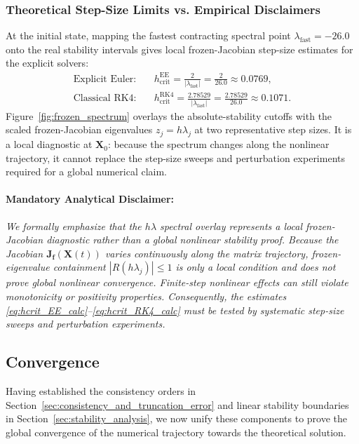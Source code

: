 \subsubsection{Theoretical Step-Size Limits vs. Empirical Disclaimers}
At the initial state, mapping the fastest contracting spectral point $\lambda_{\mathrm{fast}}=-26.0$ onto the real stability intervals gives local frozen-Jacobian step-size estimates for the explicit solvers:
\begin{align}
\text{Explicit Euler:} \quad & h_{\mathrm{crit}}^{\mathrm{EE}} = \frac{2}{|\lambda_{\mathrm{fast}}|} = \frac{2}{26.0} \approx 0.0769, \label{eq:hcrit_EE_calc} \\
\text{Classical RK4:} \quad & h_{\mathrm{crit}}^{\mathrm{RK4}} = \frac{2.78529}{|\lambda_{\mathrm{fast}}|} = \frac{2.78529}{26.0} \approx 0.1071. \label{eq:hcrit_RK4_calc}
\end{align}
Figure~\ref{fig:frozen_spectrum} overlays the absolute-stability cutoffs
with the scaled frozen-Jacobian eigenvalues $z_j=h\lambda_j$ at two
representative step sizes. It is a local diagnostic at $\mathbf{X}_0$:
because the spectrum changes along the nonlinear trajectory, it cannot
replace the step-size sweeps and perturbation experiments required for a
global numerical claim.

\paragraph{Mandatory Analytical Disclaimer:}
\emph{We formally emphasize that the $h\lambda$ spectral overlay represents a local frozen-Jacobian diagnostic rather than a global nonlinear stability proof. Because the Jacobian $\mathbf{J}_{\mathbf{f}}(\mathbf{X}(t))$ varies continuously along the matrix trajectory, frozen-eigenvalue containment $|R(h\lambda_j)| \le 1$ is only a local condition and does not prove global nonlinear convergence. Finite-step nonlinear effects can still violate monotonicity or positivity properties. Consequently, the estimates \eqref{eq:hcrit_EE_calc}--\eqref{eq:hcrit_RK4_calc} must be tested by systematic step-size sweeps and perturbation experiments.}

\subsection{Convergence}

\label{sec:convergence}

Having established the consistency orders in Section~\ref{sec:consistency_and_truncation_error} and linear stability boundaries in Section~\ref{sec:stability_analysis}, we now unify these components to prove the global convergence of the numerical trajectory towards the theoretical solution.

